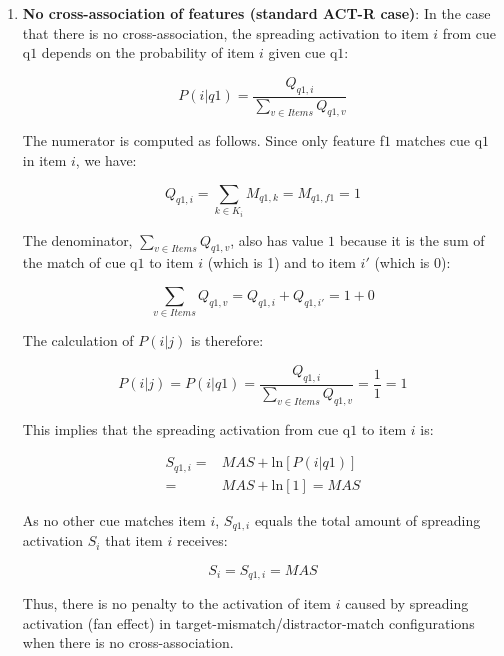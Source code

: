 \documentclass{cambridge7A}\usepackage[]{graphicx}\usepackage[]{color}
\begin{document}
\begin{enumerate}
\item
\textbf{No cross-association of features (standard ACT-R case)}:
In the case that there is no cross-association, the spreading activation to item $i$ from cue q$1$ depends on the probability of item $i$ given cue q$1$:

\begin{equation} \label{eq:newfannoxassoc2}
	P(i|q1) = \frac{Q_{q1,i}}{\sum\limits_{v\in Items} Q_{q1,v}}
\end{equation}

The numerator is computed as follows. Since only feature f$1$ matches cue q$1$ in item $i$, we have:

\begin{equation}
Q_{q1,i} = \sum_{k \in K_i} M_{q1,k} = M_{q1,f1} = 1
\end{equation}

The denominator, $\sum\limits_{v \in Items} Q_{q1,v}$, also has value $1$ because it is the sum of the match of cue q$1$ to item $i$ (which is 1) and to item $i'$ (which is 0):

\begin{equation}
\sum_{v\in Items} Q_{q1,v} = Q_{q1,i} + Q_{q1,i'} = 1 + 0 
\end{equation}

The  calculation of $P(i|j)$ is therefore:

\begin{equation}
P(i|j) =  P(i|q1) = \frac{Q_{q1,i}}{\sum\limits_{v \in Items} Q_{q1,v}} = \frac{1}{1} = 1 
\end{equation}

This implies that the spreading activation from cue q$1$ to item $i$ is:

\begin{equation}
\begin{split} 
	S_{q1,i} =& \textit{MAS} + \text{ln}[P(i|q1)] \\
	         =& \textit{MAS} + \text{ln}[1] = \textit{MAS}
\end{split}
\end{equation}

As no other cue matches item $i$, $S_{q1,i}$ equals the total amount of spreading activation $S_i$ that item $i$ receives: 

\begin{equation}
	S_{i} = S_{q1,i} = \textit{MAS} 
\end{equation}

Thus, there is no penalty to the activation of item $i$ caused by spreading activation (fan effect) in target-mismatch/distractor-match configurations when there is no cross-association. 


\end{enumerate}
\end{document}
